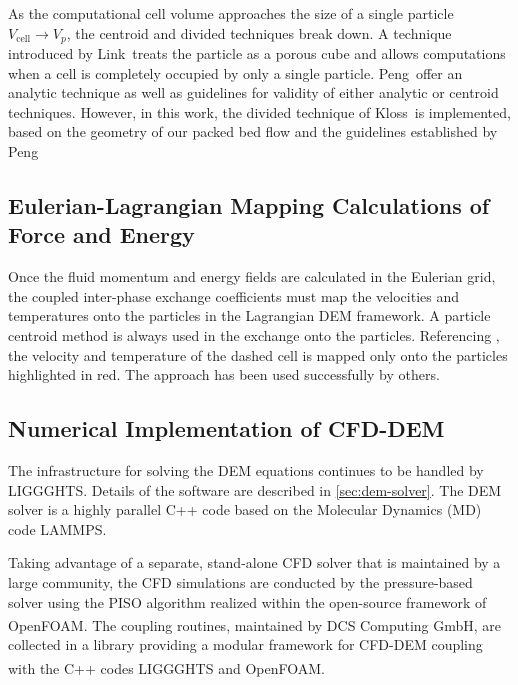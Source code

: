 As the computational cell volume approaches the size of a single particle $V_\text{cell}\rightarrow V_p$, the centroid and divided techniques break down. A technique introduced by Link\etal~treats the particle as a porous cube and allows computations when a cell is completely occupied by only a single particle.\cite{Link2005} Peng\etal~offer an analytic technique as well as guidelines for validity of either analytic or centroid techniques.\cite{Peng2014} However, in this work, the divided technique of Kloss\etal~is implemented, based on the geometry of our packed bed flow and the guidelines established by Peng\etal\cite{Kloss2012,Peng2014}


\subsection{Eulerian-Lagrangian Mapping Calculations of Force and Energy}
Once the fluid momentum and energy fields are calculated in the Eulerian grid, the coupled inter-phase exchange coefficients must map the velocities and temperatures onto the particles in the Lagrangian DEM framework. A particle centroid method is always used in the exchange onto the particles. Referencing , the velocity and temperature of the dashed cell is mapped only onto the particles highlighted in red. The approach has been used successfully by others.\cite{Xu1997,Link2005,Kloss2012}



\subsection{Numerical Implementation of CFD-DEM}\label{sec:cfd-dem-solver}

The infrastructure for solving the DEM equations continues to be handled by LIGGGHTS. Details of the software are described in \cref{sec:dem-solver}. The DEM solver is a highly parallel C++ code based on the Molecular Dynamics (MD) code LAMMPS.\cite{Plimpton1995}

Taking advantage of a separate, stand-alone CFD solver that is maintained by a large community, the CFD simulations are conducted by the pressure-based solver using the PISO algorithm realized within the open-source framework of OpenFOAM\textsuperscript{\textregistered}.\cite{Issa1986,OpenCFDLtd2014} The coupling routines, maintained by DCS Computing GmbH, are collected in a library providing a modular framework for CFD-DEM coupling with the C++ codes LIGGGHTS and OpenFOAM\textsuperscript{\textregistered}.\cite{Kloss2012,Goniva2012}

